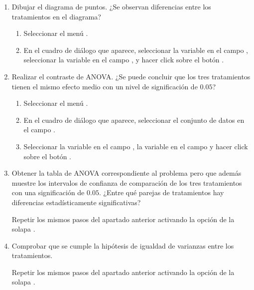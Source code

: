 \begin {enumerate}[leftmargin=*]
\begin{enumerate}
\item Dibujar el diagrama de puntos. ¿Se observan diferencias entre los tratamientos en el diagrama?
\begin{indicacion}{
\begin{enumerate}
\item Seleccionar el menú .
\item En el cuadro de diálogo que aparece, seleccionar la variable  en el campo , seleccionar la variable  en el campo , y hacer click sobre el botón
.
\end{enumerate}
}
\end{indicacion}

\item Realizar el contraste de ANOVA. 
¿Se puede concluir que los tres tratamientos tienen el mismo efecto medio con un nivel de significación de $0.05$?
\begin{indicacion}{
\begin{enumerate}
\item Seleccionar el menú .
\item En el cuadro de diálogo que aparece, seleccionar el conjunto de datos  en el campo .
\item Seleccionar la variable  en el campo , la variable
 en el campo  y hacer click sobre el botón .
\end{enumerate}}
\end{indicacion}

\item Obtener la tabla de ANOVA correspondiente al problema pero que además muestre los intervalos de confianza de
comparación de los tres tratamientos con una significación de $0.05$.
¿Entre qué parejas de tratamientos hay diferencias estadísticamente significativas?
\begin{indicacion}{ 
Repetir los mismos pasos del apartado anterior activando la opción  de la solapa .}
\end{indicacion}

\item Comprobar que se cumple la hipótesis de igualdad de varianzas entre los tratamientos.
\begin{indicacion}{ 
Repetir los mismos pasos del apartado anterior activando la opción  de la solapa .}
\end{indicacion}


\end{enumerate}
\end{enumerate}
